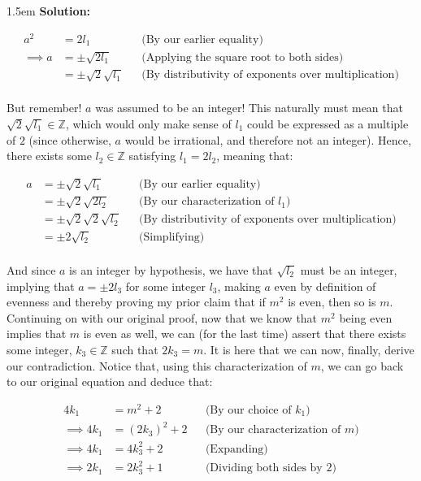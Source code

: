 \documentclass{article}
\newenvironment{solution}{
	\vspace{.5em}
	\par
	\begin{adjustwidth}{1.5em}{}
	\textbf{{Solution:}}
	\par
	\vspace{.5em}
}{
	\vspace{1em}
	\end{adjustwidth}
	\setcounter{step}{0}
}
\newcounter{step}
\begin{document}
\begin{solution}
	\begin{align*}
		a^{2} &= 2l_{1} &&\text{(By our earlier equality)} \\
		\implies a &= \pm \sqrt{2l_{1}} &&\text{(Applying the square root to both sides)} \\
		&= \pm \sqrt{2}\sqrt{l_{1}} &&\text{(By distributivity of exponents over multiplication)} \\
	\end{align*}

	But remember! $a$ was assumed to be an integer! This naturally must mean that $\sqrt{2}\sqrt{l_{1}} \in \mathbb{Z}$, which would only make sense of $l_{1}$ could be expressed as a multiple of $2$ (since otherwise, $a$ would be irrational, and therefore not an integer). Hence, there exists some $l_{2} \in \mathbb{Z}$ satisfying $l_{1} = 2l_{2}$, meaning that:

	\begin{align*}
		a &= \pm \sqrt{2}\sqrt{l_{1}} &&\text{(By our earlier equality)} \\
		&= \pm \sqrt{2}\sqrt{2l_{2}} &&\text{(By our characterization of $l_{1}$)} \\
		&= \pm \sqrt{2}\sqrt{2}\sqrt{l_{2}} &&\text{(By distributivity of exponents over multiplication)} \\
		&= \pm 2\sqrt{l_{2}} &&\text{(Simplifying)} \\
	\end{align*}

	And since $a$ is an integer by hypothesis, we have that $\sqrt{l_{2}}$ must be an integer, implying that $a = \pm 2l_{3}$ for some integer $l_{3}$, making $a$ even by definition of evenness and thereby proving my prior claim that if $m^{2}$ is even, then so is $m$. \\

	Continuing on with our original proof, now that we know that $m^{2}$ being even implies that $m$ is even as well, we can (for the last time) assert that there exists some integer, $k_{3} \in \mathbb{Z}$ such that $2k_{3} = m$. It is here that we can now, finally, derive our contradiction. Notice that, using this characterization of $m$, we can go back to our original equation and deduce that:

	\begin{align*}
		4k_{1} &= m^{2} + 2 &&\text{(By our choice of $k_{1}$)} \\
		\implies 4k_{1} &= \left(2k_{3}\right)^{2} + 2 &&\text{(By our characterization of $m$)} \\
		\implies 4k_{1} &= 4k^{2}_{3} + 2 &&\text{(Expanding)} \\
		\implies 2k_{1} &= 2k^{2}_{3} + 1 &&\text{(Dividing both sides by 2)} \\
	\end{align*}


\end{solution}
\end{document}
